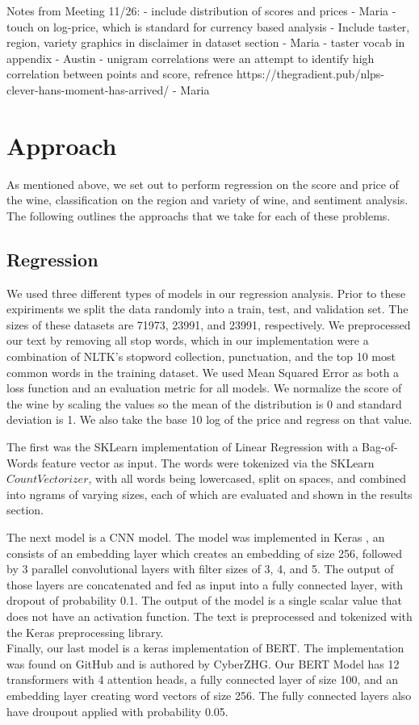 \documentclass[10pt]{IEEEtran}
\begin{document}
    Notes from Meeting 11/26:
    - include distribution of scores and prices - Maria
        - touch on log-price, which is standard for currency based analysis
    - Include taster, region, variety graphics in disclaimer in dataset section - Maria
    - taster vocab in appendix - Austin
    - unigram correlations were an attempt to identify high correlation between points and score, refrence https://thegradient.pub/nlps-clever-hans-moment-has-arrived/ - Maria

\section{Approach}
    As mentioned above, we set out to perform regression on the score and price of the wine, classification on the region and variety of wine, and sentiment analysis. The following outlines the approachs that we take for each of these problems.

\subsection{Regression}
    We used three different types of models in our regression analysis. Prior to these expiriments we split the data randomly into a train, test, and validation set. The sizes of these datasets are 71973, 23991, and 23991, respectively. We preprocessed our text by removing all stop words, which in our implementation were a combination of NLTK's stopword collection, punctuation, and the top 10 most common words in the training dataset. We used Mean Squared Error as both a loss function and an evaluation metric for all models. We normalize the score of the wine by scaling the values so the mean of the distribution is 0 and standard deviation is 1. We also take the base 10 log of the price and regress on that value. \par
    The first was the SKLearn implementation of Linear Regression with a Bag-of-Words feature vector as input. The words were tokenized via the SKLearn $CountVectorizer$, with all words being lowercased, split on spaces, and combined into ngrams of varying sizes, each of which are evaluated and shown in the results section. \par
    The next model is a CNN model. The model was implemented in Keras \cite{keras}, an consists of an embedding layer which creates an embedding of size 256, followed by 3 parallel convolutional layers with filter sizes of 3, 4, and 5. The output of those layers are concatenated and fed as input into a fully connected layer, with dropout of probability 0.1. The output of the model is a single scalar value that does not have an activation function. The text is preprocessed and tokenized with the Keras preprocessing library. \\
    Finally, our last model is a keras implementation of BERT. The implementation was found on GitHub and is authored by CyberZHG\cite{keras_bert}. Our BERT Model has 12 transformers with 4 attention heads, a fully connected layer of size 100, and an embedding layer creating word vectors of size 256. The fully connected layers also have droupout applied with probability 0.05.
\end{document}
